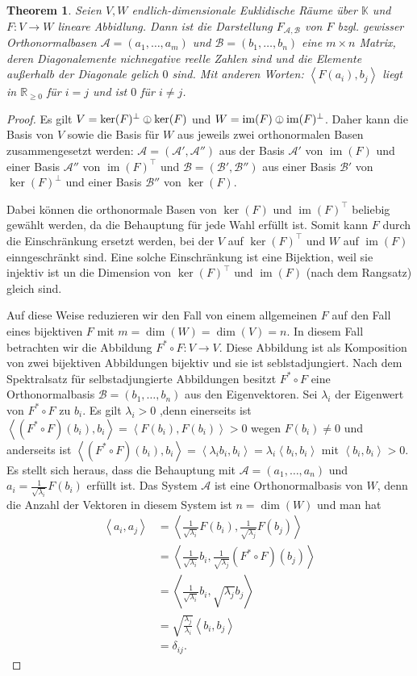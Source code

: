 \documentclass[
a4paper,12pt,
bibliography=totocnumbered,
numbers=noenddot,
]{scrartcl}
\numberwithin{equation}{subsection}
\newcommand{\R}{\mathbb R}
\newcommand{\K}{\mathbb K}
\newcommand{\im}{\operatorname{im}} %
\newcommand{\cA}{\mathcal{A}}
\newcommand{\cB}{\mathcal{B}}
\newcommand{\scalar}[1]{\left\langle #1 \right\rangle}
\newcommand{\obot}{\mathrel{\tikz[baseline=-\the\dimexpr\fontdimen22\textfont2\relax]{ \node[circle,draw,inner sep=0pt,scale=0.625,line width=0.3pt]{$ \bot $}; }}} %
\theoremstyle{plain}
\newtheorem*{thm}{Theorem}
\theoremstyle{definition}
\begin{document}
\begin{thm}
	Seien $V, W$ endlich-dimensionale Euklidische Räume über $\K$ und  $F : V \to W$ lineare Abbidlung. Dann ist die Darstellung $F_{\cA,\cB}$ von $F$ bzgl. gewisser Orthonormalbasen $\cA = (a_1,\ldots,a_m)$ und $\cB= (b_1,\ldots,b_n)$ eine $m \times n$ Matrix, deren Diagonalemente nichnegative reelle Zahlen sind und die Elemente außerhalb der Diagonale gelich $0$ sind. Mit anderen Worten: $\scalar{F(a_i),b_j}$ liegt in $\R_{\ge 0}$ für $i  = j$ und ist $0$ für $i \ne j$. 
\end{thm}
\begin{proof}
	Es gilt $V =  \ker(F)^\bot \obot \ker(F)$  und $W = \im(F) \obot \im(F)^\bot$. Daher kann die Basis von $V$ sowie die Basis für $W$ aus jeweils zwei orthonormalen Basen zusammengesetzt werden: $\cA = (\cA',\cA'')$ aus der Basis $\cA'$ von $\im(F)$ und einer Basis $\cA''$ von $\im(F)^\top$ und $\cB=(\cB', \cB'')$ aus einer Basis $\cB'$ von $\ker(F)^\bot$ und einer Basis $\cB''$ von $\ker(F)$. 
	
	 Dabei können die orthonormale Basen von $\ker(F)$ und $\im(F)^\top$ beliebig gewählt werden, da die Behauptung für jede Wahl erfüllt ist. Somit kann $F$ durch die Einschränkung ersetzt werden, bei der $V$ auf $\ker(F)^\top$ und $W$ auf $\im(F)$ einngeschränkt sind. Eine solche Einschränkung ist eine Bijektion, weil sie injektiv ist un die Dimension von $\ker(F)^\top$ und $\im(F)$ (nach dem Rangsatz) gleich sind. 
	 
	 Auf diese Weise reduzieren wir den Fall von einem allgemeinen $F$ auf den Fall eines bijektiven $F$ mit $m = \dim(W) = \dim(V) =n$. In diesem Fall betrachten wir die Abbildung $F^\ast \circ F : V \to V$. Diese Abbildung ist als Komposition von zwei bijektiven Abbildungen bijektiv und sie ist seblstadjungiert. Nach dem Spektralsatz für selbstadjungierte Abbildungen besitzt $F^\ast \circ F$ eine Orthonormalbasis $\cB = (b_1,\ldots,b_n)$  aus den Eigenvektoren. Sei $\lambda_i$ der Eigenwert von $F^\ast \circ F$ zu $b_i$. Es gilt $\lambda_i> 0$ ,denn einerseits ist $\scalar{ (F^\ast \circ F)(b_i), b_i } = \scalar{ F(b_i), F(b_i)} > 0$ wegen $F(b_i) \ne 0$ und anderseits ist $\scalar{ (F^\ast \circ F)(b_i), b_i } = \scalar{\lambda_i b_i , b_i} = \lambda_i \scalar{ b_i , b_i}$ mit $\scalar{b_i,b_i}> 0$. Es stellt  sich heraus, dass die Behauptung mit $\cA = (a_1,\ldots,a_n)$ und $a_i = \frac{1}{\sqrt{\lambda_i}} F(b_i)$ erfüllt ist. Das System $\cA$ ist eine Orthonormalbasis von $W$, denn die Anzahl der Vektoren in diesem System ist $n=\dim(W)$ und man hat 
	 \begin{align*}
	 	\scalar{ a_i , a_j} & = \scalar{ \frac{1}{\sqrt{\lambda_i}} F(b_i) , \frac{1}{\sqrt{\lambda_j}} F(b_j)} \\ & = \scalar{ \frac{1}{\sqrt{\lambda_i}} b_i , \frac{1}{\sqrt{\lambda_j}} (F^\ast \circ  F)(b_j)}  
	 	\\ & = \scalar{ \frac{1}{\sqrt{\lambda_i}} b_i , \sqrt{\lambda_j}b_j}  
	 	\\ &  = \sqrt{ \frac{\lambda_j}{\lambda_i} } \scalar{b_i , b_j} 
	 	\\ & = \delta_{ij}. 
	 \end{align*}
 

\end{proof}
\end{document}
